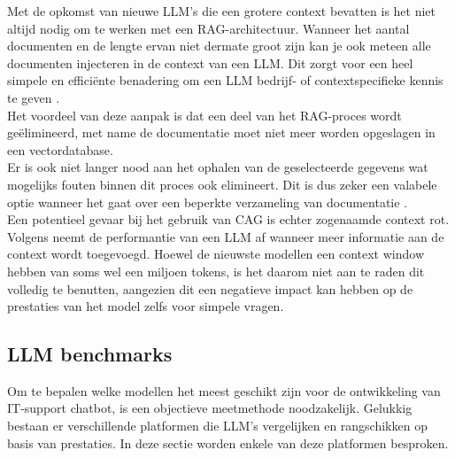 Met de opkomst van nieuwe LLM's die een grotere context bevatten is het niet altijd nodig om te werken met een RAG-architectuur. Wanneer het aantal documenten en de lengte ervan niet dermate groot zijn kan je ook meteen alle documenten injecteren in de context van een LLM. Dit zorgt voor een heel simpele en efficiënte benadering om een LLM bedrijf- of contextspecifieke kennis te geven \autocite{Chan2025}.
\\[1em]
Het voordeel van deze aanpak is dat een deel van het RAG-proces wordt geëlimineerd, met name de documentatie moet niet meer worden opgeslagen in een vectordatabase. 
\\[1em]
Er is ook niet langer nood aan het ophalen van de geselecteerde gegevens wat mogelijks fouten binnen dit proces ook elimineert. Dit is dus zeker een valabele optie wanneer het gaat over een beperkte verzameling van documentatie \autocite{Chan2025}. 
\\[1em]
Een potentieel gevaar bij het gebruik van CAG is echter zogenaamde context rot. Volgens \textcite{hong2025context} neemt de performantie van een LLM af wanneer meer informatie aan de context wordt toegevoegd. Hoewel de nieuwste modellen een context window hebben van soms wel een miljoen tokens, is het daarom niet aan te raden dit volledig te benutten, aangezien dit een negatieve impact kan hebben op de prestaties van het model zelfs voor simpele vragen.

\subsection{LLM benchmarks}
Om te bepalen welke modellen het meest geschikt zijn voor de ontwikkeling van IT-support chatbot, is een objectieve meetmethode noodzakelijk. Gelukkig bestaan er verschillende platformen die LLM's vergelijken en rangschikken op basis van prestaties. In deze sectie worden enkele van deze platformen besproken.
   
